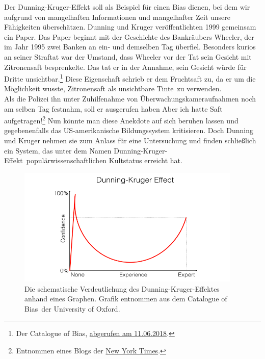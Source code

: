 Der Dunning-Kruger-Effekt soll als Beispiel für einen Bias dienen, bei dem wir aufgrund von mangelhaften Informationen und mangelhafter Zeit unsere Fähigkeiten überschätzen. Dunning und Kruger veröffentlichten 1999 gemeinsam ein Paper.\cite{KRU99} Das Paper beginnt mit der Geschichte des Bankräubers Wheeler, der im Jahr 1995 zwei Banken an ein- und demselben Tag überfiel. Besonders kurios an seiner Straftat war der Umstand, dass Wheeler vor der Tat sein Gesicht mit Zitronensaft besprenkelte. Das tat er in der Annahme, sein Gesicht würde für Dritte unsichtbar.\footnote{Der Catalogue of Bias, \href{https://catalogofbias.org/2018/03/22/twenty-years-of-bias-and-the-dunning-kruger-effect/}{abgerufen am 11.06.2018}.} Diese Eigenschaft schrieb er dem Fruchtsaft zu, da er um die Möglichkeit wusste, Zitronensaft als \glqq unsichtbare Tinte\grqq~zu verwenden. \\

Als die Polizei ihn unter Zuhilfenahme von Überwachungskameraufnahmen noch am selben Tag festnahm, soll er ausgerufen haben \glqq Aber ich hatte Saft aufgetragen!\grqq\footnote{Entnommen eines Blogs der \href{https://opinionator.blogs.nytimes.com/2010/06/20/the-anosognosics-dilemma-1/?_r=0}{New York Times}.} Nun könnte man diese Anekdote auf sich beruhen lassen und gegebenenfalls das US-amerikanische Bildungssystem kritisieren. Doch Dunning und Kruger nehmen sie zum Anlass für eine Untersuchung und finden schließlich ein System, das unter dem Namen \glqq Dunning-Kruger-Effekt\grqq~populärwissenschaftlichen Kultstatus erreicht hat. \\

\begin{figure}[htbp]
	\begin{center}
		\includegraphics[width=0.95\textwidth]{Bilder/dunning-kruger.png}
		\caption{Die schematische Verdeutlichung des Dunning-Kruger-Effektes anhand eines Graphen. Grafik entnommen aus dem \glqq Catalogue of Bias\grqq~der University of Oxford.}
		\label{fig:dunning-kruger-effekt}
	\end{center}
\end{figure}

